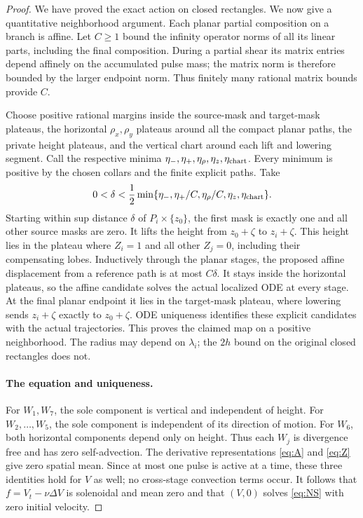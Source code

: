 \documentclass[11pt]{article}
\theoremstyle{remark}
\begin{document}
\begin{proof}
We have proved the exact action on closed rectangles. We now give a
quantitative neighborhood argument. Each planar partial composition on a
branch is affine. Let $C\ge1$ bound the infinity operator norms of all its
linear parts, including the final composition. During a partial shear its
matrix entries depend affinely on the accumulated pulse mass; the matrix
norm is therefore bounded by the larger endpoint norm. Thus finitely many
rational matrix bounds provide $C$.

Choose positive rational margins inside the source-mask and target-mask
plateaus, the horizontal $\rho_x,\rho_y$ plateaus around all the compact
planar paths, the private height plateaus, and the vertical chart around
each lift and lowering segment. Call the respective minima
$\eta_-,\eta_+,\eta_\rho,\eta_z,\eta_{\rm chart}$.
Every minimum is positive by the chosen collars and the finite explicit
paths. Take
\[
 0<\delta<\frac12\min\{
 \eta_-,\eta_+/C,\eta_\rho/C,\eta_z,\eta_{\rm chart}\}.
\]
Starting within sup distance $\delta$ of $P_i\times\{z_0\}$, the first
mask is exactly one and all other source masks are zero. It lifts the
height from $z_0+\zeta$ to $z_i+\zeta$. This height lies in the plateau
where $Z_i=1$ and all other $Z_j=0$, including their compensating lobes.
Inductively through the planar stages, the proposed affine displacement
from a reference path is at most $C\delta$. It stays inside the horizontal
plateaus, so the affine candidate solves the actual localized ODE at every
stage. At the final planar endpoint it lies in the target-mask plateau,
where lowering sends $z_i+\zeta$ exactly to $z_0+\zeta$. ODE uniqueness
identifies these explicit candidates with the actual trajectories. This
proves the claimed map on a positive neighborhood. The radius may depend
on $\lambda_i$; the $2h$ bound on the original closed rectangles does not.

\paragraph{The equation and uniqueness.}
For $W_1,W_7$, the sole component is vertical and independent of height.
For $W_2,\ldots,W_5$, the sole component is independent of its direction
of motion. For $W_6$, both horizontal components depend only on height.
Thus each $W_j$ is divergence free and has zero self-advection. The
derivative representations \eqref{eq:A} and \eqref{eq:Z} give zero
spatial mean. Since at most one pulse is active at a time, these three
identities hold for $V$ as well; no cross-stage convection terms occur.
It follows that $f=V_t-\nu\Delta V$ is solenoidal and mean zero and
that $(V,0)$ solves \eqref{eq:NS} with zero initial velocity.


\end{proof}
\end{document}
